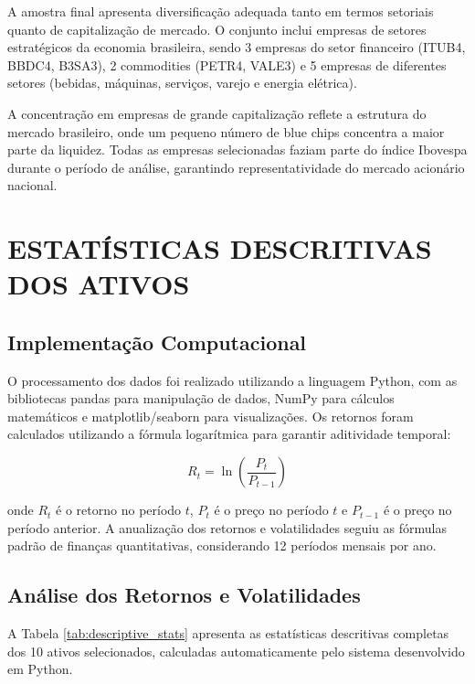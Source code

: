 A amostra final apresenta diversificação adequada tanto em termos setoriais quanto de capitalização de mercado. O conjunto inclui empresas de setores estratégicos da economia brasileira, sendo 3 empresas do setor financeiro (ITUB4, BBDC4, B3SA3), 2 commodities (PETR4, VALE3) e 5 empresas de diferentes setores (bebidas, máquinas, serviços, varejo e energia elétrica).

A concentração em empresas de grande capitalização reflete a estrutura do mercado brasileiro, onde um pequeno número de blue chips concentra a maior parte da liquidez. Todas as empresas selecionadas faziam parte do índice Ibovespa durante o período de análise, garantindo representatividade do mercado acionário nacional.

\section{ESTATÍSTICAS DESCRITIVAS DOS ATIVOS}

\subsection{Implementação Computacional}

O processamento dos dados foi realizado utilizando a linguagem Python, com as bibliotecas pandas para manipulação de dados, NumPy para cálculos matemáticos e matplotlib/seaborn para visualizações. Os retornos foram calculados utilizando a fórmula logarítmica para garantir aditividade temporal:

\begin{equation}
R_t = \ln\left(\frac{P_t}{P_{t-1}}\right)
\end{equation}

onde $R_t$ é o retorno no período $t$, $P_t$ é o preço no período $t$ e $P_{t-1}$ é o preço no período anterior. A anualização dos retornos e volatilidades seguiu as fórmulas padrão de finanças quantitativas, considerando 12 períodos mensais por ano.

\subsection{Análise dos Retornos e Volatilidades}

A Tabela \ref{tab:descriptive_stats} apresenta as estatísticas descritivas completas dos 10 ativos selecionados, calculadas automaticamente pelo sistema desenvolvido em Python.



